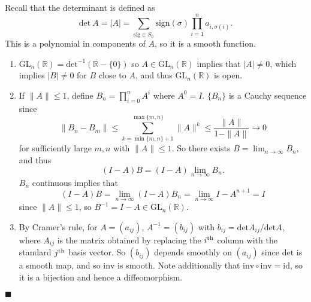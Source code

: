 \documentclass[letter-paper]{tufte-book}
\newenvironment{proof}[1][Proof]{\begin{trivlist}
\item[\hskip \labelsep {\bfseries #1}]}{\end{trivlist}}
\newcommand{\qed}{\hfill$\blacksquare$}
\begin{document}
\begin{proof}
  Recall that the determinant is defined as
  \begin{equation*}
    \mbox{det}\ A = |A| = \sum_{\mbox{sig} \in S_n} \mbox{sign}(\sigma) \prod_{i=1}^n a_{i, \sigma(i)}.
  \end{equation*}
  This is a polynomial in components of $A$, so it is a smooth function.
  
  \begin{enumerate}
    \item $\mbox{GL}_n(\mathbb{R}) = \mbox{det}^{-1}(\mathbb{R} - \{0\})$ so $A
    \in \mbox{GL}_n(\mathbb{R})$ implies that $|A| \neq 0$, which implies $|B|
    \neq 0$ for $B$ close to $A$, and thus $\mbox{GL}_n(\mathbb{R})$ is open.
    
    \item If $\|A\| \leq 1$, define $B_n = \prod_{i=0}^n A^i$ where $A^0 = I$.
    $\{B_n\}$ is a Cauchy sequence since
    \begin{equation*}
      \|B_n - B_m\| \leq \sum_{k = \min\{m,n\} + 1}^{\max\{m,n\}} \|A\|^k \leq \frac{\|A\|}{1 - \|A\|} \to 0
    \end{equation*}
    for sufficiently large $m,n$ with $\|A\| \leq 1$. So there exists $B =
    \lim_{n\to\infty} B_n$, and thus
    \begin{equation*}
      (I - A) B = (I - A) \lim_{n\to\infty} B_n.
    \end{equation*}
    $B_n$ continuous implies that
    \begin{equation*}
      (I - A)B = \lim_{n\to\infty} (I - A) B_n = \lim_{n\to\infty} I - A^{n+1} = I
    \end{equation*}
    since $\|A\| \leq 1$, so $B^{-1} = I - A \in \mbox{GL}_n(\mathbb{R})$.
    
    \item By Cramer's rule, for $A = (a_{ij})$, $A^{-1} = (b_{ij})$ with $b_{ij}
    = \mbox{det} A_{ij} / \mbox{det} A$, where $A_{ij}$ is the matrix obtained
    by replacing the $i^{\textnormal{th}}$ column with the standard
    $j^{\textnormal{th}}$ basis vector. So $(b_{ij})$ depends smoothly on
    $(a_{ij})$ since $\mbox{det}$ is a smooth map, and so $\mbox{inv}$ is
    smooth. Note additionally that $\mbox{inv}\circ\mbox{inv} = \mbox{id}$, so
    it is a bijection and hence a diffeomorphism.
  \end{enumerate}
  \qed
\end{proof}
\end{document}
